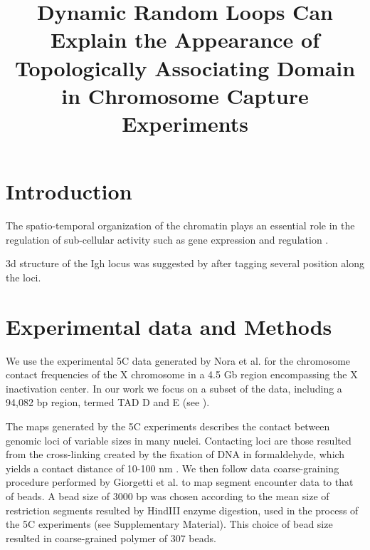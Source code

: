 \documentclass[12pt]{paper}
\begin{document}
\title{Dynamic Random Loops Can Explain the Appearance of Topologically Associating Domain in Chromosome Capture Experiments}
\maketitle

\section{Introduction}\label{section_introduction}

The spatio-temporal organization of the chromatin plays an essential role in the regulation of sub-cellular activity such as gene expression and regulation \cite{cremer2001chromosome}. 




3d structure of the Igh locus was suggested by \cite{jhunjhunwala20083d} after tagging several position along the loci. 


\section{Experimental data and Methods}\label{section_methods}

We use the experimental 5C data generated by Nora et al.\cite{Nora2012} for the chromosome contact frequencies of the X chromosome in a 4.5 Gb region encompassing the X inactivation center. In our work we focus on a subset of the data, including a 94,082 bp region, termed TAD D and E (see \cite{Nora2012}). 

The maps generated by the 5C experiments describes the contact between genomic loci of variable sizes in many nuclei. Contacting loci are those resulted from the cross-linking created by the fixation of DNA in formaldehyde, which  yields a contact distance of 10-100 nm \cite{dekker2013exploring}. We then follow data coarse-graining procedure performed by Giorgetti et al.\cite{Giorgetti2014} to map segment encounter data to that of beads. A bead size of 3000 bp was chosen according to the mean size of restriction segments resulted by HindIII enzyme digestion, used in the process of the 5C experiments (see \cite{Giorgetti2014} Supplementary Material). This choice of bead size resulted in coarse-grained polymer of 307 beads. 
\end{document}
